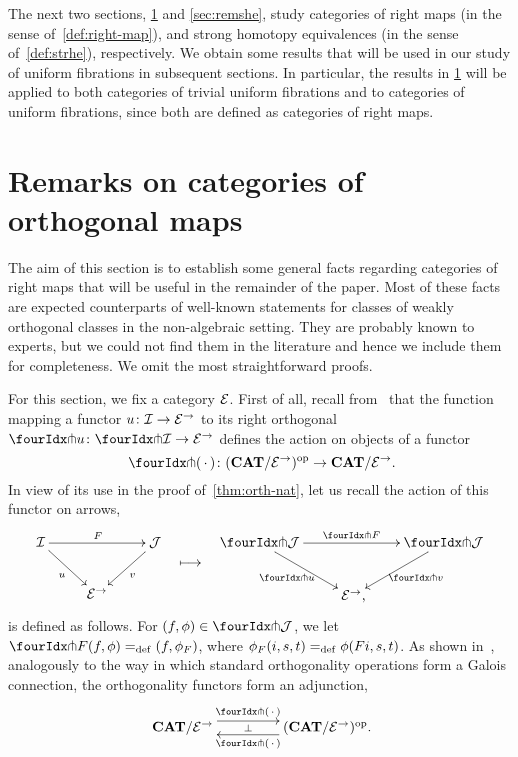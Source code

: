 \documentclass[reqno,10pt,a4paper,oneside,draft]{amsart}
\begin{document}
The next two sections, \cref{sec:ortf} and \cref{sec:remshe}, study categories of right maps (in the sense of~\cref{def:right-map}), and strong homotopy equivalences (in the sense of~\cref{def:strhe}), respectively. We obtain some results that will be used in our study of uniform fibrations in subsequent sections.
In particular, the results in \cref{sec:ortf} will be applied to both categories of trivial uniform fibrations and to categories of uniform fibrations, since both are defined as categories of right maps.


\section{Remarks on categories of orthogonal maps}
\label{sec:ortf}

The aim of this section is to establish some general facts regarding categories of right maps that will be useful in the remainder of the paper. Most of these facts are expected counterparts of well-known statements for classes of weakly orthogonal classes in the non-algebraic setting. They are probably known to experts, but we could not find them in the literature and hence we include them for completeness. We omit the most straightforward proofs.

For this section, we fix a category $\mathcal{E}$.
First of all, recall from~\cite{garner:small-object-argument} that the function mapping a functor $u \colon \mathcal{I} \to \mathcal{E}^\to$ to its right orthogonal $\liftr{u} \co \liftr{\cal{I}} \to \catE^\to$ defines the action on objects of a functor
\[
  \liftr{\brarghole} \co (\CAT/\catE^\to)^{\op} \to \CAT/\catE^\to \rlap{.}
\]
In view of its use in the proof of~\cref{thm:orth-nat}, let us recall the action of this functor on arrows,
\begin{align*}
\xymatrix{
  \cal{I} \ar[dr]_u \ar[rr]^F & & \cal{J} \ar[dl]^{v} \\
  & \catE^\to
}
&&
\xymatrix{
  \ar@{}[d]|{\textstyle\longmapsto} \\
  {}
}
&&
\xymatrix{
  \liftr{\cal{J}} \ar[dr]_{\liftr{u}} \ar[rr]^{\liftr{F}} & & \liftr{\cal{J}} \ar[dl]^{\liftr{v}} \\
  & \catE^\to \rlap{,}
}
\end{align*}
is defined as follows.
For $(f, \phi) \in \liftr{\cal{J}}$, we let $\liftr{F}(f,\phi) \defeq (f, \phi_F)$, where $\phi_F(i, s, t) =_{\operatorname{def}} \phi(Fi, s, t)$.
As shown in~\cite[Proposition~3.8]{garner:small-object-argument}, analogously to the way in which standard orthogonality operations form a Galois connection, the orthogonality functors form an adjunction,
\begin{equation} \label{garner-adjunction}
\begin{gathered}
\xymatrix@C+2em{
  \CAT/\catE^\to
  \ar@<5pt>[r]^-{\liftl{\brarghole}}
  \ar@{}[r]|-{\bot}
&
  (\CAT/\catE^\to)^{\op} \rlap{.}
  \ar@<5pt>[l]^-{\liftr{\brarghole}}
}
\end{gathered}
\end{equation}
\end{document}
